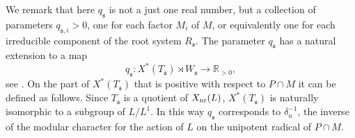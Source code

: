 \documentclass[11pt]{amsart}
\theoremstyle{definition}
\begin{document}
We remark that here $q_{{\mathfrak s}}$ is not a just one real number, but a collection of parameters 
$q_{{{\mathfrak s}},i} > 0$, one for each factor $M_i$ of $M$, or
equivalently one for each irreducible component of the root system $R_{{\mathfrak s}}$. 
The parameter $q_{{\mathfrak s}}$ has a natural extension to a map 
\[
q_{{\mathfrak s}} : X^* (T_{{\mathfrak s}}) \rtimes W_{{\mathfrak s}} \to {\mathbb R}_{>0} ,
\]
see \cite[\S 1]{Lus1}. On the part of $X^* (T_{{\mathfrak s}})$ that is positive with respect to 
$P \cap M$ it can be defined as follows. Since $T_{{\mathfrak s}}$ 
is a quotient of $X_{{\rm nr}} (L)$, $X^* (T_{{\mathfrak s}})$ is naturally isomorphic to a subgroup of 
$L / L^1$. In this way $q_{{\mathfrak s}}$ corresponds to $\delta_u^{-1}$, the inverse of the modular 
character for the action of $L$ on the unipotent radical of $P \cap M$.
\end{document}
